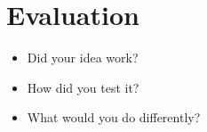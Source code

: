 \section{\notstarted Evaluation}

\begin{itemize}
    \item Did your idea work?
    \item How did you test it?
    \item What would you do differently?
\end{itemize}
